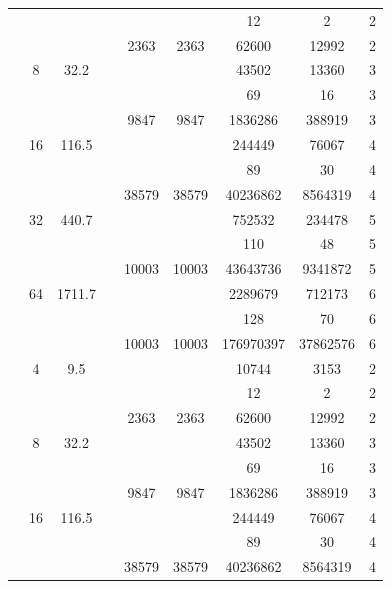\begin{table}[htbp]
\begin{tabular}{l S[table-format=3.0] S[table-format=4.1] l S[table-format=6.0] S[table-format=6.0] S[table-format=6.0] S[table-format=5.0] S[table-format=2.0]}
     &  &  &  & {\text{---}} & {\text{---}} & 12 & 2 & 2 \\
     &  &  &  & 2363 & 2363 & 62600 & 12992 & 2 \\
     & 8 & 32.2 &  & {\text{---}} & {\text{---}} & 43502 & 13360 & 3 \\
     &  &  &  & {\text{---}} & {\text{---}} & 69 & 16 & 3 \\
     &  &  &  & 9847 & 9847 & 1836286 & 388919 & 3 \\
     & 16 & 116.5 &  & {\text{---}} & {\text{---}} & 244449 & 76067 & 4 \\
     &  &  &  & {\text{---}} & {\text{---}} & 89 & 30 & 4 \\
     &  &  &  & 38579 & 38579 & 40236862 & 8564319 & 4 \\
     & 32 & 440.7 &  & {\text{---}} & {\text{---}} & 752532 & 234478 & 5 \\
     &  &  &  & {\text{---}} & {\text{---}} & 110 & 48 & 5 \\
     &  &  &  & 10003 & 10003 & 43643736 & 9341872 & 5 \\
     & 64 & 1711.7 &  & {\text{---}} & {\text{---}} & 2289679 & 712173 & 6 \\
     &  &  &  & {\text{---}} & {\text{---}} & 128 & 70 & 6 \\
     &  &  &  & 10003 & 10003 & 176970397 & 37862576 & 6 \\
    \midrule
     & 4 & 9.5 &  & {\text{---}} & {\text{---}} & 10744 & 3153 & 2 \\
     &  &  &  & {\text{---}} & {\text{---}} & 12 & 2 & 2 \\
     &  &  &  & 2363 & 2363 & 62600 & 12992 & 2 \\
     & 8 & 32.2 &  & {\text{---}} & {\text{---}} & 43502 & 13360 & 3 \\
     &  &  &  & {\text{---}} & {\text{---}} & 69 & 16 & 3 \\
     &  &  &  & 9847 & 9847 & 1836286 & 388919 & 3 \\
     & 16 & 116.5 &  & {\text{---}} & {\text{---}} & 244449 & 76067 & 4 \\
     &  &  &  & {\text{---}} & {\text{---}} & 89 & 30 & 4 \\
     &  &  &  & 38579 & 38579 & 40236862 & 8564319 & 4 \\

\end{tabular}
\end{table}
